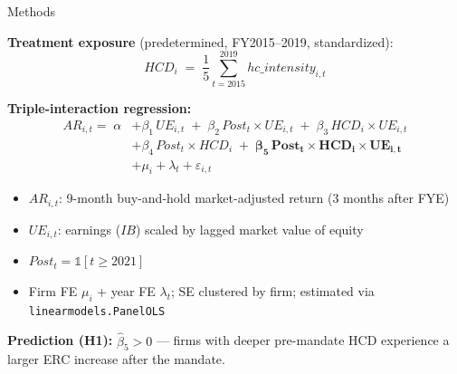 \documentclass[aspectratio=169]{beamer}
\begin{document}
\begin{frame}{Methods}

\textbf{Treatment exposure} (predetermined, FY2015--2019, standardized):
\[
HCD_i \;=\; \frac{1}{5}\sum_{t=2015}^{2019} hc\_intensity_{i,t}
\]

\textbf{Triple-interaction regression:}
{\small
\begin{align*}
AR_{i,t} =\; \alpha
&+ \beta_1\, UE_{i,t}
\;+\; \beta_2\, Post_t \times UE_{i,t}
\;+\; \beta_3\, HCD_i \times UE_{i,t}\\
&+ \beta_4\, Post_t \times HCD_i
\;+\; \boldsymbol{\beta_5\, Post_t \times HCD_i \times UE_{i,t}}\\
&+ \mu_i + \lambda_t + \varepsilon_{i,t}
\end{align*}}

\begin{itemize}
  \item $AR_{i,t}$: 9-month buy-and-hold market-adjusted return (3 months after FYE)
  \item $UE_{i,t}$: earnings ($IB$) scaled by lagged market value of equity
  \item $Post_t = \mathbb{1}[t \geq 2021]$
  \item Firm FE $\mu_i$ + year FE $\lambda_t$; SE clustered by firm; estimated via \texttt{linearmodels.PanelOLS}
\end{itemize}

\textbf{Prediction (H1):} $\hat{\beta}_5 > 0$ --- firms with deeper pre-mandate HCD experience a larger ERC increase after the mandate.

\end{frame}
\end{document}
